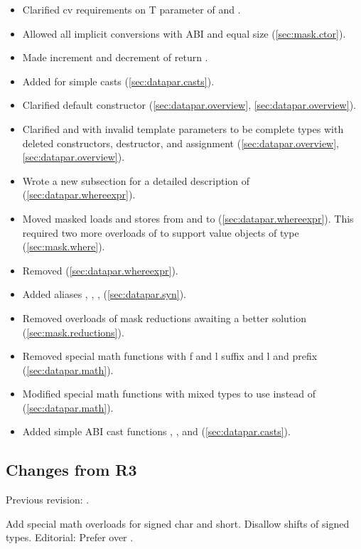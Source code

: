 \begin{itemize}
    \item Clarified cv requirements on \type T parameter of \datapar and \mask.
    \item Allowed all implicit \mask conversions with \fixedsize ABI and equal size (\ref{sec:mask.ctor}).
    \item Made increment and decrement of  return .
    \item Added  for simple casts (\ref{sec:datapar.casts}).
    \item Clarified default constructor (\ref{sec:datapar.overview}, \ref{sec:datapar.overview}).
    \item Clarified \datapar and \mask with invalid template parameters to be complete types with deleted constructors, destructor, and assignment (\ref{sec:datapar.overview}, \ref{sec:datapar.overview}).
    \item Wrote a new subsection for a detailed description of  (\ref{sec:datapar.whereexpr}).
    \item Moved masked loads and stores from \datapar and \mask to  (\ref{sec:datapar.whereexpr}).
          This required two more overloads of  to support value objects of type \mask (\ref{sec:mask.where}).
    \item Removed  (\ref{sec:datapar.whereexpr}).
    \item Added aliases , , ,  (\ref{sec:datapar.syn}).
    \item Removed \bool overloads of mask reductions awaiting a better solution (\ref{sec:mask.reductions}).
    \item Removed special math functions with \code f and \code l suffix and \code l and  prefix (\ref{sec:datapar.math}).
    \item Modified special math functions with mixed types to use  instead of  (\ref{sec:datapar.math}).
    \item Added simple ABI cast functions , , and  (\ref{sec:datapar.casts}).
\end{itemize}

\subsection{Changes from R3}
Previous revision: \citep{P0214R3}.
\begin{itemize}
  \chck Add special math overloads for signed char and short.
  \chck Disallow shifts of signed types.
  \chck Editorial: Prefer  over .
\end{itemize}







